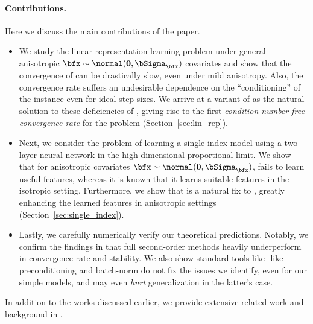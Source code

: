 \paragraph{Contributions.} Here we discuss the main contributions of the paper.
\begin{itemize}[left=0pt]
\vspace{-.7em}

    \item We study the linear representation learning problem under general anisotropic $\bfx \sim \normal(\mathbf{0}, \bSigma_\bfx)$ covariates and show that the convergence of \SGD can be drastically slow, even under mild anisotropy. Also, the convergence rate suffers an undesirable dependence on the ``conditioning'' of the instance even for ideal step-sizes. We arrive at a variant of \KFAC as the natural solution to these deficiencies of \SGD, giving rise to the first \emph{condition-number-free convergence rate} for the problem (Section~\ref{sec:lin_rep}).
    \vspace{0.2cm}
    \item Next, we consider the problem of learning a single-index model using a two-layer neural network in the high-dimensional proportional limit. We show that for anisotropic covariates $\bfx \sim \normal(\mathbf{0}, \bSigma_\bfx)$, \SGD fails to learn useful features, whereas it is known that it learns suitable features in the isotropic setting. Furthermore, we show that \KFAC is a natural fix to \SGD, greatly enhancing the learned features in anisotropic settings (Section~\ref{sec:single_index}).

    \item Lastly, we carefully numerically verify our theoretical predictions. Notably, we confirm the findings in \citet{benzing2022gradient} that full second-order methods heavily underperform \KFAC in convergence rate and stability. We also show standard tools like \Adam-like preconditioning and batch-norm \cite{ioffe2015batch} do not fix the issues we identify, even for our simple models, and may even \emph{hurt} generalization in the latter's case.

    
\end{itemize}

\vspace{-0.3cm}

In addition to the works discussed earlier, we provide extensive related work and background in .
\vspace{-0.4cm}
